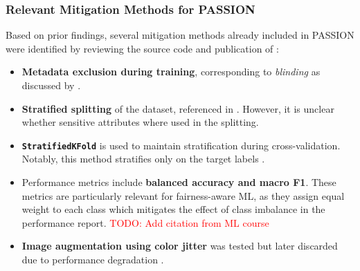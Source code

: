 \documentclass[12pt, a4paper, oneside]{book}   	%
\renewcommand{\todo}[1]{\textcolor{red}{TODO: #1}}
\renewcommand{\paragraph}[1]{%
	\subsubsection*{#1}%
}
\begin{document}
	
		\paragraph{Relevant Mitigation Methods for PASSION}
		Based on prior findings, several mitigation methods already included in PASSION were identified by reviewing the source code and publication of \textcite{Gottfrois2024}:
		\begin{itemize}
			\item \textbf{Metadata exclusion during training}, corresponding to \textit{blinding} as discussed by \textcite{Chakraborty_2024}.
			
			\item \textbf{Stratified splitting} of the dataset, referenced in \textcite{Chen_2024}. However, it is unclear whether sensitive attributes where used in the splitting.
			
			\item \textbf{\texttt{StratifiedKFold}} is used to maintain stratification during cross-validation. Notably, this method stratifies only on the target labels \autocite{Sklearn_nodate}.
			
			\item Performance metrics include \textbf{balanced accuracy and macro F1}. These metrics are particularly relevant for fairness-aware \gls{ML}, as they assign equal weight to each class which mitigates the effect of class imbalance in the performance report. \todo{Add citation from ML course}
			
			\item \textbf{Image augmentation using color jitter} was tested but later discarded due to performance degradation \autocite{Gottfrois2024}.
		\end{itemize}
		
\end{document}
